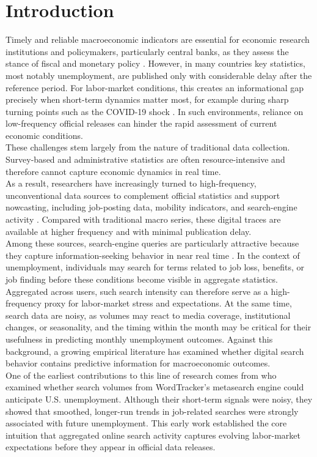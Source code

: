 \documentclass[12pt,a4paper]{article}
\begin{document}
\section{Introduction}
Timely and reliable macroeconomic indicators are essential for economic research institutions and policymakers, particularly central banks, as they assess the stance of fiscal and monetary policy \citep{simoni, BANBURA2013195}.
However, in many countries key statistics, most notably unemployment, are published only with considerable delay after the reference period.
For labor-market conditions, this creates an informational gap precisely when short-term dynamics matter most, for example during sharp turning points such as the COVID-19 shock \citep{covid}. In such environments, reliance on low-frequency official releases can hinder the rapid assessment of current economic conditions. 
\\
These challenges stem largely from the nature of traditional data collection.
Survey-based and administrative statistics are often resource-intensive and therefore cannot capture economic dynamics in real time.
\\
As a result, researchers have increasingly turned to high-frequency, unconventional data sources to complement official statistics and support nowcasting, including job-posting data, mobility indicators, and search-engine activity \citep{BARBAGLIA20231548}.
Compared with traditional macro series, these digital traces are available at higher frequency and with minimal publication delay.
\\
Among these sources, search-engine queries are particularly attractive because they capture information-seeking behavior in near real time \citep{varian}.
In the context of unemployment, individuals may search for terms related to job loss, benefits, or job finding before these conditions become visible in aggregate statistics. Aggregated across users, such search intensity can therefore serve as a high-frequency proxy for labor-market stress and expectations. At the same time, search data are noisy, as volumes may react to media coverage, institutional changes, or seasonality, and the timing within the month may be critical for their usefulness in predicting monthly unemployment outcomes.
Against this background, a growing empirical literature has examined whether digital search behavior contains predictive information for macroeconomic outcomes.\\
One of the earliest contributions to this line of research comes from \citet{ettrege} who examined whether search volumes from WordTracker’s metasearch engine could anticipate U.S. unemployment. Although their short-term signals were noisy, they showed that smoothed, longer-run trends in job-related searches were strongly associated with future unemployment. This early work established the core intuition that aggregated online search activity captures evolving labor-market expectations before they appear in official data releases.\\
\end{document}
